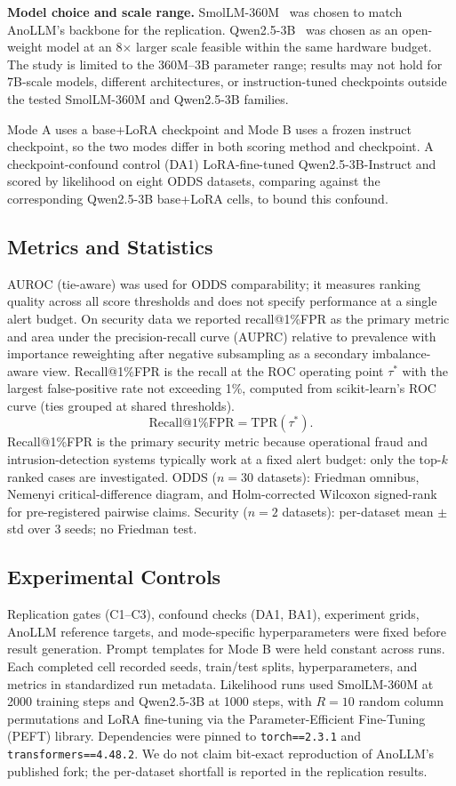 \documentclass[conference]{IEEEtran}
\begin{document}
\textbf{Model choice and scale range.}
SmolLM-360M~\cite{allal2024smollm} was chosen to match AnoLLM's backbone for the replication.
Qwen2.5-3B~\cite{qwen2025qwen25} was chosen as an open-weight model at an 8$\times$ larger scale feasible within the same hardware budget. The study is limited to the 360M--3B parameter range; results may not hold for 7B-scale models, different architectures, or instruction-tuned checkpoints outside the tested SmolLM-360M and Qwen2.5-3B families.

Mode A uses a base+LoRA checkpoint and Mode B uses a frozen instruct checkpoint, so the two modes differ in both scoring method and checkpoint.
A checkpoint-confound control (DA1) LoRA-fine-tuned Qwen2.5-3B-Instruct and scored by likelihood on eight ODDS datasets, comparing against the corresponding Qwen2.5-3B base+LoRA cells, to bound this confound.

\subsection{Metrics and Statistics}
AUROC (tie-aware) was used for ODDS comparability; it measures ranking quality across all score thresholds and does not specify performance at a single alert budget.
On security data we reported recall@1\%FPR as the primary metric and area under the precision-recall curve (AUPRC) relative to prevalence with importance reweighting after negative subsampling as a secondary imbalance-aware view.
Recall@1\%FPR is the recall at the ROC operating point $\tau^*$ with the largest false-positive rate not exceeding 1\%, computed from scikit-learn's ROC curve (ties grouped at shared thresholds).
\begin{equation}
\text{Recall@1\%FPR}=\mathrm{TPR}(\tau^*).
\end{equation}
Recall@1\%FPR is the primary security metric because operational fraud and intrusion-detection systems typically work at a fixed alert budget: only the top-$k$ ranked cases are investigated.
ODDS ($n=30$ datasets): Friedman omnibus, Nemenyi critical-difference diagram, and Holm-corrected Wilcoxon signed-rank for pre-registered pairwise claims.
Security ($n=2$ datasets): per-dataset mean $\pm$ std over 3 seeds; no Friedman test.

\subsection{Experimental Controls}
Replication gates (C1--C3), confound checks (DA1, BA1), experiment grids, AnoLLM reference targets, and mode-specific hyperparameters were fixed before result generation.
Prompt templates for Mode B were held constant across runs.
Each completed cell recorded seeds, train/test splits, hyperparameters, and metrics in standardized run metadata.
Likelihood runs used SmolLM-360M at 2000 training steps and Qwen2.5-3B at 1000 steps, with $R=10$ random column permutations and LoRA fine-tuning via the Parameter-Efficient Fine-Tuning (PEFT) library.
Dependencies were pinned to \texttt{torch==2.3.1} and \texttt{transformers==4.48.2}.
We do not claim bit-exact reproduction of AnoLLM's published fork; the per-dataset shortfall is reported in the replication results.
\end{document}

